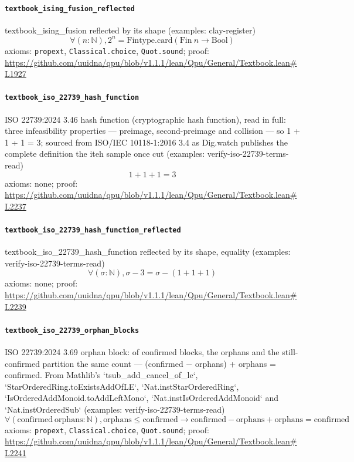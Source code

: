 \documentclass[11pt]{article}
\begin{document}
\paragraph{\texttt{textbook\_ising\_fusion\_reflected}}
textbook\_ising\_fusion reflected by its shape (examples: clay-register)
\[ \forall (n : \mathbb{N}), 2 ^{n} = \mathrm{Fintype.card} (\mathrm{Fin}\ n \to \mathrm{Bool}) \]
\noindent axioms: \texttt{propext}, \texttt{Classical.choice}, \texttt{Quot.sound}; proof: \url{https://github.com/uuidna/qpu/blob/v1.1.1/lean/Qpu/General/Textbook.lean\#L1927}

\paragraph{\texttt{textbook\_iso\_22739\_hash\_function}}
ISO 22739:2024 3.46 hash function (cryptographic hash function), read in full: three infeasibility properties — preimage, second-preimage and collision — so 1 + 1 + 1 = 3; sourced from ISO/IEC 10118-1:2016 3.4 as Dig.watch publishes the complete definition the iteh sample once cut (examples: verify-iso-22739-terms-read)
\[ 1 + 1 + 1 = 3 \]
\noindent axioms: none; proof: \url{https://github.com/uuidna/qpu/blob/v1.1.1/lean/Qpu/General/Textbook.lean\#L2237}

\paragraph{\texttt{textbook\_iso\_22739\_hash\_function\_reflected}}
textbook\_iso\_22739\_hash\_function reflected by its shape, equality (examples: verify-iso-22739-terms-read)
\[ \forall (\sigma : \mathbb{N}), \sigma - 3 = \sigma - (1 + 1 + 1) \]
\noindent axioms: none; proof: \url{https://github.com/uuidna/qpu/blob/v1.1.1/lean/Qpu/General/Textbook.lean\#L2239}

\paragraph{\texttt{textbook\_iso\_22739\_orphan\_blocks}}
ISO 22739:2024 3.69 orphan block: of confirmed blocks, the orphans and the still-confirmed partition the same count — (confirmed − orphans) + orphans = confirmed. From Mathlib's `tsub\_add\_cancel\_of\_le`, `StarOrderedRing.toExistsAddOfLE`, `Nat.instStarOrderedRing`, `IsOrderedAddMonoid.toAddLeftMono`, `Nat.instIsOrderedAddMonoid` and `Nat.instOrderedSub` (examples: verify-iso-22739-terms-read)
\[ \forall (\mathrm{confirmed}\ \mathrm{orphans} : \mathbb{N}), \mathrm{orphans} \le \mathrm{confirmed} \to \mathrm{confirmed} - \mathrm{orphans} + \mathrm{orphans} = \mathrm{confirmed} \]
\noindent axioms: \texttt{propext}, \texttt{Classical.choice}, \texttt{Quot.sound}; proof: \url{https://github.com/uuidna/qpu/blob/v1.1.1/lean/Qpu/General/Textbook.lean\#L2241}
\end{document}
